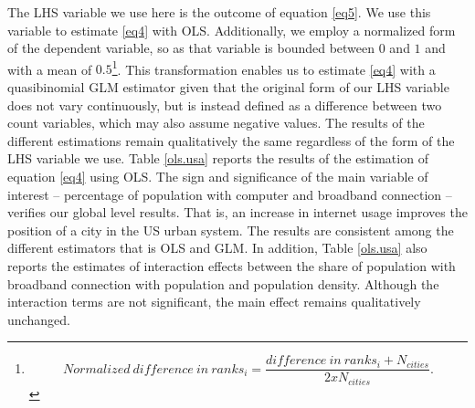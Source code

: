 \documentclass[10pt,letterpaper]{article}
\begin{document}
The LHS variable we use here is the outcome of equation \ref{eq5}.
\color{blue} We use this variable to estimate \ref{eq4} with OLS.
Additionally, we employ a normalized form of the dependent variable, so
as that variable is bounded between \(0\) and \(1\) and with a mean of
\(0.5\)\footnote{\[Normalized\:difference\:in\:ranks_{i} = \frac{difference\:in\:ranks_{i} + N_{cities}}{2xN_{cities}}.\]}.
This transformation enables us to estimate \ref{eq4} with a
quasibinomial GLM estimator given that the original form of our LHS
variable does not vary continuously, but is instead defined as a
difference between two count variables, which may also assume negative
values. \color{blue} The results of the different estimations remain
qualitatively the same regardless of the form of the LHS variable we
use. Table \ref{ols.usa} reports the results of the estimation of
equation \ref{eq4} using OLS. The sign and significance of the main
variable of interest -- percentage of population with computer and
broadband connection -- verifies our global level results. That is, an
increase in internet usage improves the position of a city in the US
urban system. The results are consistent among the different estimators
that is OLS and GLM. In addition, Table \ref{ols.usa} also reports the
estimates of interaction effects between the share of population with
broadband connection with population and population density. Although
the interaction terms are not significant, the main effect remains
qualitatively unchanged.
\end{document}
